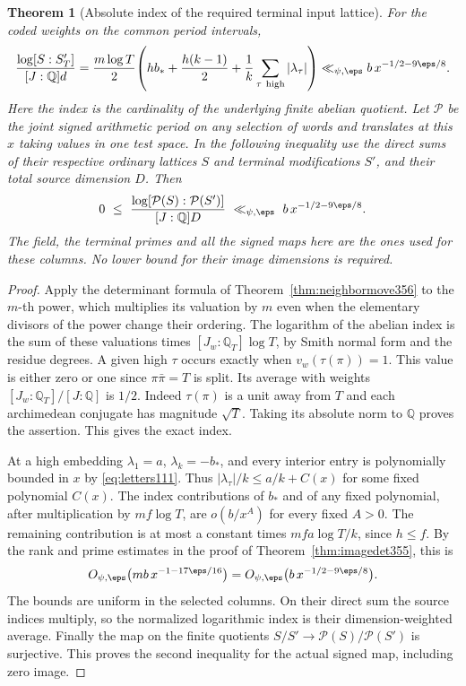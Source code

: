 \documentclass[a4paper,11pt]{article}
\newtheorem{theorem}[proposition]{Theorem}
\theoremstyle{definition}
\theoremstyle{remark}
\numberwithin{equation}{section}
\begin{document}
\begin{theorem}[Absolute index of the required terminal input lattice]\leavevmode
\label{thm:neighborindex356}
For the coded weights on the common period intervals,
\[
 \frac{\log [S:S_T']}{[J:\mathbb Q]d}
     =\frac{m\log T}{2}\!
       \left(h b_*+\frac{h(k-1)}2+
              \frac1k\sum_{\tau\ {\rm high}}|\lambda_\tau|\right)
     \ll_{\psi,\eps} b\,x^{-1/2-9\eps/8}.
\]
Here the index is the cardinality of the underlying finite
abelian quotient. Let \(\mathcal P\) be the joint signed
arithmetic period on any selection of words and translates
at this \(x\) taking values in one test space. In the following
inequality use the direct sums of their respective ordinary
lattices \(S\) and terminal modifications \(S'\), and their
total source dimension \(D\). Then
\[
       0\ \le\
       \frac{\log[\mathcal P(S):\mathcal P(S')]}{[J:\mathbb Q]D}
           \ \ll_{\psi,\eps}\ b\,x^{-1/2-9\eps/8}.
\]
The field, the terminal primes and all the signed maps here are
the ones used for these columns. No lower bound for their image
dimensions is required.
\end{theorem}
\begin{proof}
Apply the determinant formula of
Theorem~\ref{thm:neighbormove356} to the \(m\)-th power,
which multiplies its valuation by \(m\) even when the
elementary divisors of the power change their ordering.
The logarithm of the abelian index is the sum of these
valuations times \([J_w:\mathbb Q_T]\log T\), by Smith
normal form and the residue degrees. A given high \(\tau\)
occurs exactly when \(v_w(\tau(\pi))=1\). This value is
either zero or one since \(\pi\bar\pi=T\) is split.
Its average with weights \([J_w:\mathbb Q_T]/[J:\mathbb Q]\)
is \(1/2\). Indeed \(\tau(\pi)\) is a unit away from
\(T\) and each archimedean conjugate has magnitude
\(\sqrt T\). Taking its absolute norm to \(\mathbb Q\)
proves the assertion. This gives the exact index.

At a high embedding \(\lambda_1=a\), \(\lambda_k=-b_*\),
and every interior entry is polynomially bounded in \(x\)
by \eqref{eq:letters111}. Thus \(|\lambda_\tau|/k\le
a/k+C(x)\) for some fixed polynomial \(C(x)\). The
index contributions of \(b_*\) and of any fixed polynomial,
after multiplication by \(m f\log T\), are \(o(b/x^A)\)
for every fixed \(A>0\). The remaining contribution is
at most a constant times \(m f a\log T/k\), since \(h\le f\).
By the rank and prime estimates in the proof of
Theorem~\ref{thm:imagedet355}, this is
\[
       O_{\psi,\eps}\bigl(m b\,x^{-1-17\eps/16}\bigr)
                 =O_{\psi,\eps}\bigl(b\,x^{-1/2-9\eps/8}\bigr).
\]
The bounds are uniform in the selected columns. On their
direct sum the source indices multiply, so the normalized
logarithmic index is their dimension-weighted average.
Finally the map on the finite quotients
\(S/S'\longrightarrow\mathcal P(S)/\mathcal P(S')\)
is surjective. This proves the second inequality for the
actual signed map, including zero image.
\end{proof}
\end{document}
